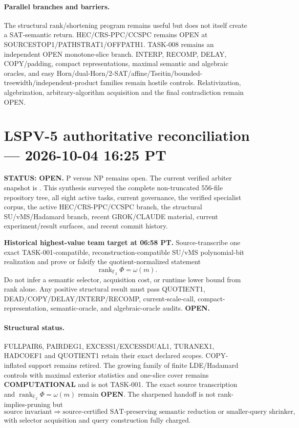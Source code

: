 \documentclass[11pt]{article}
\begin{document}
\paragraph{Parallel branches and barriers.}
The structural rank/shortening program remains useful but does not itself create a SAT-semantic return. HEC/CRS-PPC/CCSPC remains OPEN at SOURCESTOP1/PATHSTRAT1/OFFPATH1. TASK-008 remains an independent OPEN monotone-slice branch. INTERP, RECOMP, DELAY, COPY/padding, compact representations, maximal semantic and algebraic oracles, and easy Horn/dual-Horn/2-SAT/affine/Tseitin/bounded-treewidth/independent-product families remain hostile controls. Relativization, algebrization, arbitrary-algorithm acquisition and the final contradiction remain OPEN.




\section{LSPV-5 authoritative reconciliation --- 2026-10-04 16:25 PT}
\textbf{STATUS: OPEN.} P versus NP remains open. The current verified arbiter snapshot is
. This synthesis surveyed the
complete non-truncated 556-file repository tree, all eight active tasks, current governance,
the verified specialist corpus, the active HEC/CRS-PPC/CCSPC branch, the structural
SU/vMS/Hadamard branch, recent GROK/CLAUDE material, current experiment/result surfaces,
and recent commit history.

\begin{candidatebox}
\textbf{Historical highest-value team target at 06:58 PT.}
Source-transcribe one exact TASK-001-compatible, reconstruction-compatible SU/vMS
polynomial-bit realization and prove or falsify the quotient-normalized statement
\[
\operatorname{rank}_{\mathbb F_2}\Phi=\omega(m).
\]
Do not infer a semantic selector, acquisition cost, or runtime lower bound from rank alone.
Any positive structural result must pass QUOTIENT1, DEAD/COPY/DELAY/INTERP/RECOMP,
current-scale-call, compact-representation, semantic-oracle, and algebraic-oracle audits.
\textbf{OPEN.}
\end{candidatebox}

\paragraph{Structural status.}
FULLPAIR6, PAIRDEG1, EXCESS1/EXCESSDUAL1, TURANEX1, HADCOEF1 and QUOTIENT1 retain
their exact declared scopes. COPY-inflated support remains retired. The growing family of
finite LDE/Hadamard controls with maximal exterior statistics and one-slice cover remains
\textbf{COMPUTATIONAL} and is not TASK-001. The exact source transcription and
\(\operatorname{rank}_{\mathbb F_2}\Phi=\omega(m)\) remain \textbf{OPEN}.
The sharpened handoff is not rank-implies-pruning but
\[
\text{source invariant}
\Longrightarrow
\text{source-certified SAT-preserving semantic reduction or smaller-query shrinker},
\]
with selector acquisition and query construction fully charged.
\end{document}
